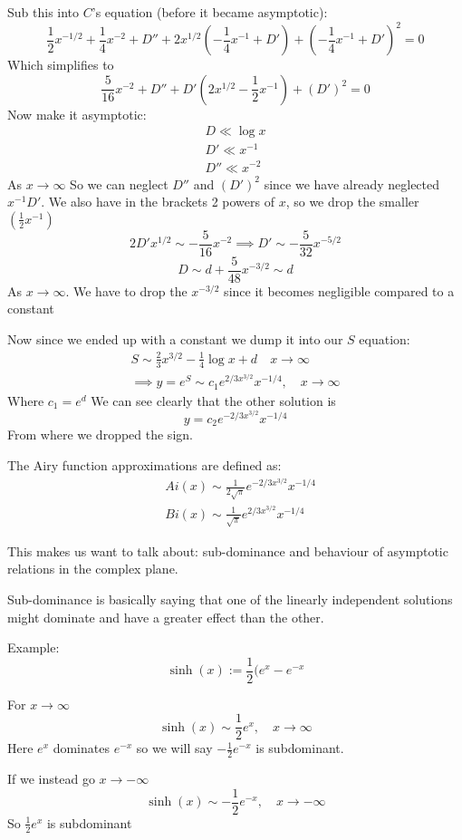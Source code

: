 \documentclass{X:/Documents/Coding/Latex/myassignment}
\begin{document}
Sub this into $C$'s equation (before it became asymptotic):
\[\frac12 x^{-1/2} + \frac14 x^{-2} + D'' + 2x^{1/2} (-\frac14 x^{-1} + D') + (-\frac14 x^{-1} + D')^2 = 0\]
Which simplifies to
\[\frac5{16}x^{-2} + D'' + D'(2x^{1/2} - \frac12 x^{-1}) + (D')^2 = 0\]
Now make it asymptotic:
\begin{align*}
    D \ll \log x\\
    D' \ll x^{-1}\\
    D'' \ll x^{-2}
\end{align*}
As $x\to \infty$
So we can neglect $D''$ and $(D')^2$ since we have already neglected $x^{-1} D'$.
We also have in the brackets 2 powers of $x$, so we drop the smaller $(\frac12 x^{-1})$
\[2D' x^{1/2} \sim - \frac5{16} x^{-2} \implies D' \sim -\frac{5}{32} x^{-5/2}\]
\[D\sim d+ \frac5{48} x^{-3/2} \sim d\]
As $x\to\infty$. We have to drop the $x^{-3/2}$ since it becomes negligible compared to a constant

Now since we ended up with a constant we dump it into our $S$ equation:
\begin{align*}
    S \sim \frac23 x^{3/2} - \frac14 \log x + d \quad x\to \infty\\
    \implies y = e^S \sim c_1 e^{2/3 x^{3/2}} x^{-1/4}, \quad x \to \infty
\end{align*}
Where $c_1 = e^d$
We can see clearly that the other solution is
\[y = c_2 e^{-2/3 x^{3/2}} x^{-1/4}\]
From where we dropped the sign.

The Airy function approximations are defined as:
\begin{align*}
    & Ai(x) \sim \frac{1}{2\sqrt{\pi}} e^{-2/3 x^{3/2}} x^{-1/4}\\
    & Bi(x) \sim \frac{1}{\sqrt{\pi}} e^{2/3 x^{3/2}} x^{-1/4}
\end{align*}

This makes us want to talk about: sub-dominance and behaviour of asymptotic relations in the complex plane.

Sub-dominance is basically saying that one of the linearly independent solutions might dominate and have a greater effect than the other.

Example:
\[\sinh(x) := \frac12 (e^x - e^{-x}\]

For $x\to \infty$
\[\sinh(x) \sim \frac12 e^x, \quad x\to\infty\]
Here $e^x$ dominates $e^{-x}$ so we will say $-\frac12 e^{-x}$ is subdominant.

If we instead go $x\to-\infty$
\[\sinh(x) \sim -\frac12 e^{-x}, \quad x\to-\infty\]
So $\frac12 e^{x}$ is subdominant
\end{document}
